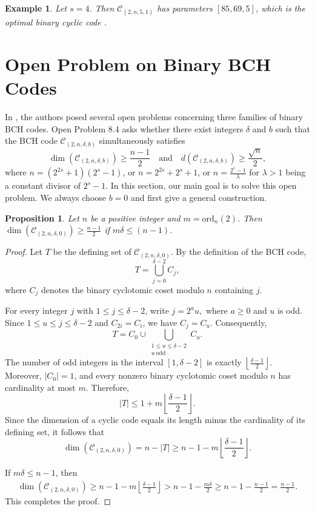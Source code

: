 \documentclass[12pt,draftcls,journal,onecolumn]{IEEEtran}
\newtheorem{proposition}[theorem]{Proposition}
\newtheorem{example}[theorem]{Example}
\newcommand{\ord}{{\mathrm{ord}}}
\newcommand{\C}{{\mathcal{C}}}
\begin{document}
\begin{example}
Let \( s = 4 \). Then \( \C_{(2,n,5,1)} \) has parameters \([85,69,5]\), which is the optimal binary cyclic code \cite[Appendix A]{DingP1}.
\end{example}


\section{Open Problem on Binary BCH Codes
}

In \cite{Chen59}, the authors posed several open problems concerning three families of binary BCH codes. Open Problem 8.4 asks whether there exist integers \(\delta\) and \(b\) such that the BCH code \(\mathcal C_{(2,n,\delta,b)}\) simultaneously satisfies
\[
\dim (\mathcal C_{(2,n,\delta,b)})\ge \frac{n-1}{2}
\quad\text{and}\quad
d(\mathcal C_{(2,n,\delta,b)})\ge \frac{\sqrt n}{2},
\]
where $n=(2^{2s}+1)(2^s-1)$, or $n=2^{2s}+2^s+1$, or $n=\frac{2^s-1}{\lambda}$ for $\lambda>1$ being a constant divisor of $2^s-1$.
In this section, our main goal is to solve this open problem. We always choose $b=0$ and first give a general construction.

\begin{proposition}\label{pros}
Let $n$ be a positive integer and $m=\ord_n(2)$. Then
 $\dim(\mathcal C_{(2,n,\delta,0)})\ge\frac{n-1}{2}$ if $m\delta\le(n-1)$.
\end{proposition}

\begin{proof}
Let $T$ be the defining set of $\mathcal C_{(2,n,\delta,0)}$. By the
definition of the BCH code,
\[
T=\bigcup_{j=0}^{\delta-2}C_j,
\]
where $C_j$ denotes the binary cyclotomic coset modulo $n$
containing $j$.

For every integer $j$ with $1\leq j\leq\delta-2$, write
$
j=2^a u,
$
where $a\geq0$ and $u$ is odd. Since $1\leq u\leq j\leq
\delta-2$ and $C_{2i}=C_i$, we have
$
C_j=C_u.
$
Consequently,
\[
T=C_0\cup
\bigcup_{\substack{1\leq u\leq\delta-2\\u\ \mathrm{odd}}}C_u.
\]
The number of odd integers in the interval
$[1,\delta-2]$ is exactly
$
\left\lfloor\frac{\delta-1}{2}\right\rfloor.
$
Moreover, $|C_0|=1$, and every nonzero binary cyclotomic
coset modulo $n$ has cardinality at most $m$. Therefore,
\[
|T|\leq
1+m\left\lfloor\frac{\delta-1}{2}\right\rfloor.
\]
Since the dimension of a cyclic code equals its length
minus the cardinality of its defining set, it follows that
\[
\dim (\mathcal C_{(2,n,\delta,0)})
=n-|T|
\geq n-1-m\left\lfloor\frac{\delta-1}{2}\right\rfloor.
\]

If $m\delta\leq n-1$, then
\[
\begin{aligned}
\dim (\mathcal C_{(2,n,\delta,0)})
\geq n-1-m\left\lfloor\frac{\delta-1}{2}\right\rfloor>n-1-\frac{m\delta}{2}\geq n-1-\frac{n-1}{2}=\frac{n-1}{2}.
\end{aligned}
\]
This completes the proof.
\end{proof}
\end{document}
